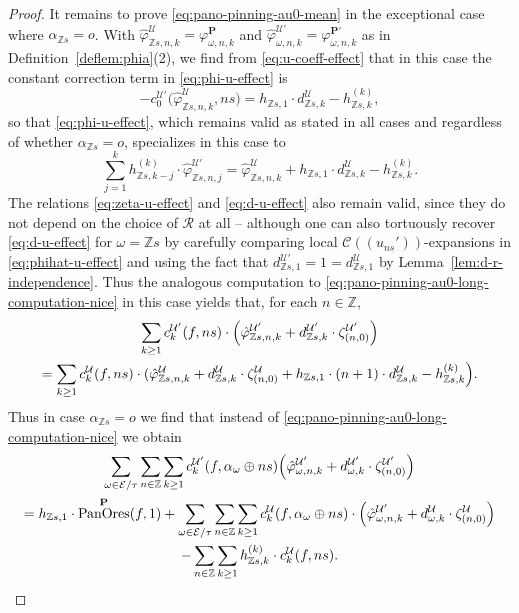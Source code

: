 \documentclass[preprint,12pt]{elsarticle}
\numberwithin{equation}{section} %
\theoremstyle{theorem}
\theoremstyle{definition}
\newcommand{\Ca}{\mathcal{C}} %
\newcommand{\ec}{\mathcal{E}} %
\newcommand{\idec}{{o}} %
\newcommand{\orbita}{{\ec/\tau}} %
\newcommand{\Z}{\mathbb{Z}} %
\newcommand{\za}[2]{\zeta^{\mathcal{U}}_{( {#1} , {#2} )}}
\DeclareMathOperator{\pano}{PanOres}
\begin{document}
\begin{proof}
    It remains to prove \eqref{eq:pano-pinning-au0-mean} in the exceptional case where $\alpha_{\Z s}=\idec$. With $\hat{\varphi}^\mathcal{U}_{\Z s,n,k}=\varphi^\mathbf{P}_{\omega,n,k}$ and $\hat{\varphi}^{\mathcal{U}'}_{\omega,n,k}=\varphi^{\mathbf{P}'}_{\omega,n,k}$ as in Definition~\ref{deflem:phia}(2), we find from \eqref{eq:u-coeff-effect} that in this case the constant correction term in \eqref{eq:phi-u-effect} is \begin{equation}\label{eq:pano-pinning-au0-phihat-constant}
        -c_0^{\mathcal{U}'}\bigl(\hat{\varphi}^\mathcal{U}_{\Z s,n,k},ns\bigr)=h_{\Z s, 1}\cdot d^\mathcal{U}_{\Z s,k}-h^{(k)}_{\Z s,k},
    \end{equation} so that \eqref{eq:phi-u-effect}, which remains valid as stated in all cases and regardless of whether $\alpha_{\Z s}=\idec$, specializes in this case to
    \begin{equation}\label{eq:phihat-u-effect}
        \sum_{j=1}^k h^{(k)}_{\Z s,k-j}\cdot\hat{\varphi}^{\mathcal{U}'}_{\Z s,n,j}=\hat{\varphi}^\mathcal{U}_{\Z s,n,k}+h_{\Z s,1}\cdot d^\mathcal{U}_{\Z s,k}-h^{(k)}_{\Z s,k}.
    \end{equation} The relations \eqref{eq:zeta-u-effect} and \eqref{eq:d-u-effect} also remain valid, since they do not depend on the choice of $\mathcal{R}$ at all -- although one can also tortuously recover \eqref{eq:d-u-effect} for $\omega=\Z s$ by carefully comparing local $\Ca((u_{ns}'))$-expansions in \eqref{eq:phihat-u-effect} and using the fact that $d^{\mathcal{U}'}_{\Z s,1}=1=d^\mathcal{U}_{\Z s,1}$ by Lemma~\ref{lem:d-r-independence}. Thus the analogous computation to \eqref{eq:pano-pinning-au0-long-computation-nice} in this case yields that, for each $n\in\Z$,
\begin{gather}\label{eq:pano-pinning-au0-long-computation-mean} \sum_{k\geq 1}c^{\mathcal{U}'}_k(f,ns)\cdot\Bigl(\hat{\varphi}^{\mathcal{U}'}_{\Z s,n,k}+d^{\mathcal{U}'}_{\Z s,k}\cdot\zeta^{\mathcal{U}'}_{(n,0)}\Bigr)\\
=\sum_{k\geq 1}c^\mathcal{U}_k(f,ns)\cdot(\hat{\varphi}^\mathcal{U}_{\Z s,n,k}+d^\mathcal{U}_{\Z s,k}\cdot\za{n}{0}+h_{\Z s,1}\cdot(n+1)\cdot d^\mathcal{U}_{\Z s,k} -h^{(k)}_{\Z s,k}\Bigr).\notag
\end{gather} Thus in case $\alpha_{\Z s}=\idec$ we find that instead of \eqref{eq:pano-pinning-au0-long-computation-nice} we obtain
\begin{multline} \label{eq:pano-pinning-au0-long-computation-mean-result}
    \sum_{\omega\in\orbita}\sum_{n\in\Z}\sum_{k\geq 1}c^{\mathcal{U}'}_k(f,\alpha_\omega\oplus ns)\Bigl(\hat{\varphi}^{\mathcal{U}'}_{\omega,n,k}+d^{\mathcal{U}'}_{\omega,k}\cdot\zeta^{\mathcal{U}'}_{(n,0)}\Bigr)\\=h_{\Z s,1}\cdot\pano^\mathbf{P}(f,1)+\sum_{\omega\in\orbita}\sum_{n\in\Z}\sum_{k\geq 1}c^{\mathcal{U}}_k(f,\alpha_\omega\oplus ns)\cdot\Bigl(\hat{\varphi}^{\mathcal{U}'}_{\omega,n,k}+d^{\mathcal{U}}_{\omega,k}\cdot\zeta^{\mathcal{U}}_{(n,0)}\Bigr)\\-\sum_{n\in\Z}\sum_{k\geq 1}h^{(k)}_{\Z s,k}\cdot c^\mathcal{U}_k(f,ns).

\end{multline}
\end{proof}
\end{document}

